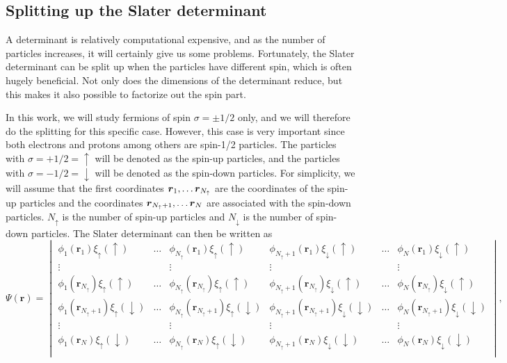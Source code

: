 \subsection{Splitting up the Slater determinant} \label{subsec:electronsystem}
A determinant is relatively computational expensive, and as the number of particles increases, it will certainly give us some problems. Fortunately, the Slater determinant can be split up when the particles have different spin, which is often hugely beneficial. Not only does the dimensions of the determinant reduce, but this makes it also possible to factorize out the spin part.

In this work, we will study fermions of spin $\sigma=\pm 1/2$ only, and we will therefore do the splitting for this specific case. However, this case is very important since both electrons and protons among others are spin-1/2 particles. The particles with $\sigma=+1/2=\uparrow$ will be denoted as the spin-up particles, and the particles with $\sigma=-1/2=\downarrow$ will be denoted as the spin-down particles. For simplicity, we will assume that the first coordinates $\boldsymbol{{r}}_1,\hdots\boldsymbol{{r}}_{N_{\uparrow}}$ are the coordinates of the spin-up particles and the coordinates $\boldsymbol{{r}}_{N_{\uparrow}+1},\hdots\boldsymbol{{r}}_N$ are associated with the spin-down particles. $N_{\uparrow}$ is the number of spin-up particles and $N_{\downarrow}$ is the number of spin-down particles. The Slater determinant can then be written as
\begin{equation*}
\Psi(\boldsymbol{r})=
\begin{vmatrix}
\phi_1(\boldsymbol{r}_1)\xi_{\uparrow}(\uparrow) & \hdots & \phi_{N_{\uparrow}}(\boldsymbol{r}_1)\xi_{\uparrow}(\uparrow) & \phi_{N_{\uparrow}+1}(\boldsymbol{r}_1)\xi_{\downarrow}(\uparrow) & \hdots & \phi_{N}(\boldsymbol{r}_1)\xi_{\downarrow}(\uparrow)\\
\vdots & & \vdots & \vdots & & \vdots \\
\phi_1(\boldsymbol{r}_{N_{\uparrow}})\xi_{\uparrow}(\uparrow) & \hdots & \phi_{N_{\uparrow}}(\boldsymbol{r}_{N_{\uparrow}})\xi_{\uparrow}(\uparrow) & \phi_{N_{\uparrow}+1}(\boldsymbol{r}_{N_{\uparrow}})\xi_{\downarrow}(\uparrow) & \hdots & \phi_{N}(\boldsymbol{r}_{N_{\uparrow}})\xi_{\downarrow}(\uparrow)\\
\phi_1(\boldsymbol{r}_{N_{\uparrow}+1})\xi_{\uparrow}(\downarrow) & \hdots & \phi_{N_{\uparrow}}(\boldsymbol{r}_{N_{\uparrow}+1})\xi_{\uparrow}(\downarrow) & \phi_{N_{\uparrow}+1}(\boldsymbol{r}_{N_{\uparrow}+1})\xi_{\downarrow}(\downarrow) & \hdots & \phi_{N}(\boldsymbol{r}_{N_{\uparrow}+1})\xi_{\downarrow}(\downarrow)\\
\vdots & & \vdots & \vdots & & \vdots \\
\phi_1(\boldsymbol{r}_N)\xi_{\uparrow}(\downarrow) & \hdots & \phi_{N_{\uparrow}}(\boldsymbol{r}_N)\xi_{\uparrow}(\downarrow) & \phi_{N_{\uparrow}+1}(\boldsymbol{r}_N)\xi_{\downarrow}(\downarrow) & \hdots & \phi_{N}(\boldsymbol{r}_N)\xi_{\downarrow}(\downarrow)\\
\end{vmatrix},
\end{equation*}
